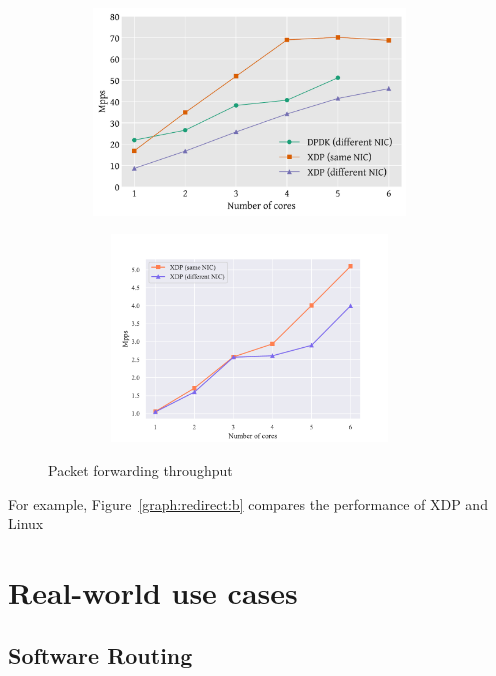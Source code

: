 \documentclass[12pt,titlepage]{article}
\begin{document}
\begin{figure}
    \centering
    \begin{minipage}{0.49\textwidth}
        \centering
        \includegraphics[width=0.95\textwidth,height=5.5cm]{original/redirect-test.pdf} %
        \label{graph:redirect:a}
    \end{minipage}\hfill
    \begin{minipage}{0.49\textwidth}
        \centering
        \includegraphics[width=0.95\textwidth,height=5.5cm]{img/redirect-test.pdf} %
        \label{graph:redirect:b}
    \end{minipage}
     \caption{Packet forwarding throughput}
     \label{graph:redirect}
\end{figure}

For example, Figure~\ref{graph:redirect:b} compares the performance of XDP and Linux


\section{Real-world use cases}

\subsection{Software Routing}
\end{document}
